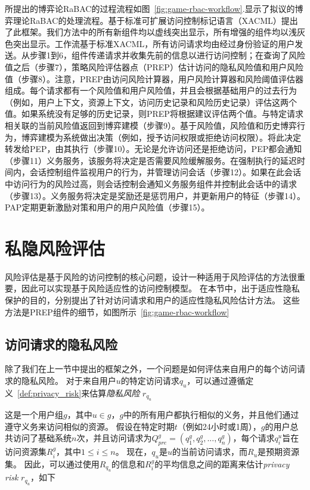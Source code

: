所提出的博弈论RaBAC的过程流程如图~\ref{fig:game-rbac-workflow}.显示了拟议的博弈理论RaBAC的处理流程。基于标准可扩展访问控制标记语言（XACML）提出了此框架。我们方法中的所有新组件均以虚线突出显示，所有增强的组件均以浅灰色突出显示。工作流基于标准XACML，所有访问请求均由经过身份验证的用户发送。从步骤1到6，组件传递请求并收集先前的信息以进行访问控制；在查询了风险值之后（步骤7），策略风险评估器点（PREP）估计访问的隐私风险值和用户风险值（步骤8）。注意，PREP由访问风险计算器，用户风险计算器和风险阈值评估器组成。每个请求都有一个风险值和用户风险值，并且会根据基础用户的过去行为（例如，用户上下文，资源上下文，访问历史记录和风险历史记录）评估这两个值。如果系统没有足够的历史记录，则PREP将根据建议评估两个值。与特定请求相关联的当前风险值返回到博弈建模（步骤9）。基于风险值，风险值和历史博弈行为，博弈建模为系统做出决策（例如，授予访问权限或拒绝访问权限）。将此决定转发给PEP，由其执行（步骤10）。无论是允许访问还是拒绝访问，PEP都会通知（步骤11）义务服务，该服务将决定是否需要风险缓解服务。在强制执行的延迟时间内，会话控制组件监视用户的行为，并管理访问会话（步骤12）。如果在此会话中访问行为的风险过高，则会话控制会通知义务服务组件并控制此会话中的请求（步骤13）。义务服务将决定是奖励还是惩罚用户，并更新用户的特征（步骤14）。 PAP定期更新激励对策和用户的用户风险值（步骤15）。

\section{私隐风险评估}
\label{sec:riskvalue}

风险评估是基于风险的访问控制的核心问题，设计一种适用于风险评估的方法很重要，因此可以实现基于风险适应性的访问控制模型。 在本节中，出于适应性隐私保护的目的，分别提出了针对访问请求和用户的适应性隐私风险估计方法。 这些方法是PREP组件的细节，如图所示~\ref{fig:game-rbac-workflow}

\subsection{访问请求的隐私风险}

除了我们在上一节中提出的框架之外，一个问题是如何评估来自用户的每个访问请求的隐私风险。 对于来自用户$u$的特定访问请求$q_u$，可以通过遵循定义~\ref{def:privacy_risk}来估算\emph{隐私风险} $r_{q_u}$



这是一个用户组$g$，其中$u \in g$，$g$中的所有用户都执行相似的义务，并且他们通过遵守义务来访问相似的资源。 假设在特定时期$t$（例如24小时或1周），$g$的用户总共访问了基础系统$n$次，并且访问请求为$Q^g_{pre}=(q^g_1,q^g_2,...,q^g_n)$，每个请求$q^u_i$旨在访问资源集$R^g_i$，其中$1 \leq i \leq n$。
现在，$q_u$是$u$的当前访问请求，而$R_u$是预期资源集。 因此，可以通过使用$R_{q_u}$的信息和$R^g_i$的平均信息之间的距离来估计\emph{privacy risk} $r_{q_u}$，如下

